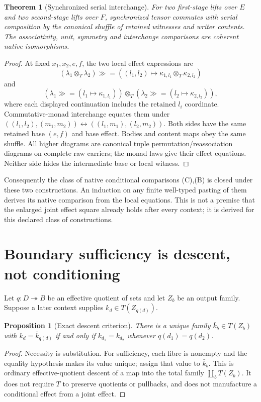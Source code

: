 \documentclass[11pt]{article}
\newtheorem{theorem}{Theorem}\newtheorem{proposition}{Proposition}\newtheorem{definition}{Definition}
\begin{document}
\begin{theorem}[Synchronized serial interchange]
For two first-stage lifts over $E$ and two second-stage lifts over $F$, synchronized tensor commutes with serial composition by the canonical shuffle of retained witnesses and writer contents. The associativity, unit, symmetry and interchange comparisons are coherent native isomorphisms.
\end{theorem}
\begin{proof}
At fixed $x_1,x_2,e,f$, the two local effect expressions are
\[
 (\lambda_1\otimes_T\lambda_2)\gg=
 ((l_1,l_2)\mapsto\kappa_{1,l_1}\otimes_T\kappa_{2,l_2})
\]
and
\[
 (\lambda_1\gg=(l_1\mapsto\kappa_{1,l_1}))
 \otimes_T
 (\lambda_2\gg=(l_2\mapsto\kappa_{2,l_2})),
\]
where each displayed continuation includes the retained $l_i$ coordinate. Commutative-monad interchange equates them under
$((l_1,l_2),(m_1,m_2))\leftrightarrow((l_1,m_1),(l_2,m_2))$.
Both sides have the same retained base $(e,f)$ and base effect. Bodies and content maps obey the same shuffle. All higher diagrams are canonical tuple permutation/reassociation diagrams on complete raw carriers; the monad laws give their effect equations. Neither side hides the intermediate base or local witness.
\end{proof}

Consequently the class of native conditional comparisons (C),(B) is closed under these two constructions. An induction on any finite well-typed pasting of them derives its native comparison from the local equations. This is not a premise that the enlarged joint effect square already holds after every context; it is derived for this declared class of constructions.

\section{Boundary sufficiency is descent, not conditioning}
Let $q:D\twoheadrightarrow B$ be an effective quotient of sets and let $Z_b$ be an output family. Suppose a later context supplies $k_d\in T(Z_{q(d)})$.
\begin{proposition}[Exact descent criterion]
There is a unique family $\bar k_b\in T(Z_b)$ with $k_d=\bar k_{q(d)}$ if and only if $k_{d_1}=k_{d_2}$ whenever $q(d_1)=q(d_2)$.
\end{proposition}
\begin{proof}
Necessity is substitution. For sufficiency, each fibre is nonempty and the equality hypothesis makes its value unique; assign that value to $\bar k_b$. This is ordinary effective-quotient descent of a map into the total family $\coprod_b T(Z_b)$. It does not require $T$ to preserve quotients or pullbacks, and does not manufacture a conditional effect from a joint effect.
\end{proof}
\end{document}
